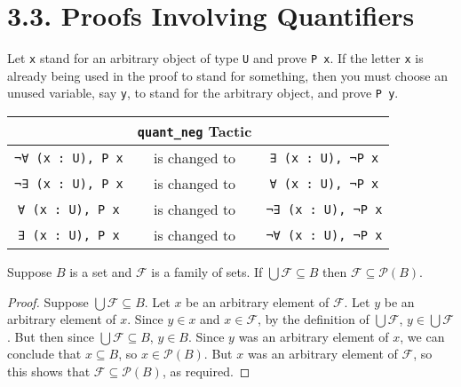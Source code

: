 \documentclass[
  letterpaper,
  DIV=11,
  numbers=noendperiod]{scrreprt}
\newenvironment{ind}
	{\begin{list}{}{\setlength{\leftmargin}{1em}}\item\relax}
	{\end{list}}
\newcommand{\excl}[1]{}
\theoremstyle{remark}
\begin{document}
\hypertarget{proofs-involving-quantifiers}{%
\section{3.3. Proofs Involving
Quantifiers}\label{proofs-involving-quantifiers}}

\begin{ind}
Let \texttt{x} stand for an arbitrary object of type \texttt{U} and
prove \texttt{P\ x}. If the letter \texttt{x} is already being used in
the proof to stand for something, then you must choose an unused
variable, say \texttt{y}, to stand for the arbitrary object, and prove
\texttt{P\ y}.

\end{ind}

\begin{longtable}[]{@{}ccc@{}}
\toprule\noalign{}
& \texttt{quant\_neg} Tactic & \\
\midrule\noalign{}
\endhead
\bottomrule\noalign{}
\endlastfoot
\texttt{¬∀\ (x\ :\ U),\ P\ x} & is changed to &
\texttt{∃\ (x\ :\ U),\ ¬P\ x} \\
\texttt{¬∃\ (x\ :\ U),\ P\ x} & is changed to &
\texttt{∀\ (x\ :\ U),\ ¬P\ x} \\
\texttt{∀\ (x\ :\ U),\ P\ x} & is changed to &
\texttt{¬∃\ (x\ :\ U),\ ¬P\ x} \\
\texttt{∃\ (x\ :\ U),\ P\ x} & is changed to &
\texttt{¬∀\ (x\ :\ U),\ ¬P\ x} \\
\end{longtable}

\begin{thm}
Suppose \(B\) is a set and \(\mathcal{F}\) is a family of sets. If
\(\bigcup\mathcal{F} \subseteq B\) then
\(\mathcal{F} \subseteq \mathscr{P}(B)\).

\end{thm}

\begin{proof}

Suppose \(\bigcup \mathcal{F} \subseteq B\). Let \(x\) be an arbitrary
element of \(\mathcal{F}\). Let \(y\) be an arbitrary element of \(x\).
Since \(y \in x\) and \(x \in \mathcal{F}\), by the definition of
\(\bigcup \mathcal{F}\), \(y \in \bigcup \mathcal{F}\). But then since
\(\bigcup \mathcal{F} \subseteq B\), \(y \in B\). Since \(y\) was an
arbitrary element of \(x\), we can conclude that \(x \subseteq B\), so
\(x \in \mathscr{P}(B)\). But \(x\) was an arbitrary element of
\(\mathcal{F}\), so this shows that
\(\mathcal{F} \subseteq \mathscr{P}(B)\), as required. \excl{~□}\qedhere

\end{proof}
\end{document}

